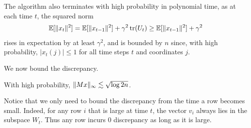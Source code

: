The algorithm also terminates with high probability in polynomial time, as at each time $t$, the squared norm
\[\mathbb{E}[\|x_t\|^2] = \mathbb{E}[\|x_{t-1}\|^2] + \gamma^2 \operatorname{tr}(U_t) \geq \mathbb{E}[\|x_{t-1}\|^2] + \gamma^2\]  rises  in expectation by at least $\gamma^2$, and is bounded by $n$ since, with high probability, $|x_t(j)| \le 1$ for all time steps $t$ and coordinates $j$.

 \medskip
%
We now bound the discrepancy.
\begin{theorem}
\label{thm:alg-komlos-bana}
  With high probability,  $\|Mx\|_\infty \lesssim \sqrt{\log 2n}$.   
\end{theorem}
Notice that we only need to bound the discrepancy from the time a row becomes small. 
Indeed, for any row $i$ that is large at time $t$, the vector $v_i$ always lies in the subspace $W_t$. Thus any row incurs $0$ discrepancy as long as it is large.



